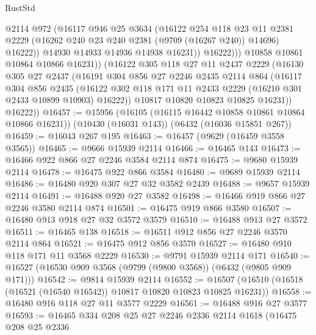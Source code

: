 \begin{lexlean}{RustStd}
\begin{coremodule}
                    @2114
                    @972
                    (@16117
                      @946
                      @25
                      @3634
                      (@16122
                        @254
                        @118
                        @23
                        @11
                        @2381
                        @2229
                        (@16262 @240 @23 @240 @2381 (@9709 (@16267 @240)) @14696)
                        @16222))
                    @14930
                    @14933
                    @14936
                    @14938
                    @16231))
                @16222)))
          @10858
          @10861
          @10864
          @10866
          @16231))
      (@16122
        @305
        @118
        @27
        @11
        @2437
        @2229
        (@16130
          @305
          @27
          @2437
          (@16191
            @304
            @856
            @27
            @2246
            @2435
            @2114
            @864
            (@16117
              @304
              @856
              @2435
              (@16122 @302 @118 @171 @11 @2433 @2229 (@16210 @301 @2433 @10899 @10903) @16222))
            @10817
            @10820
            @10823
            @10825
            @16231))
        @16222))
@16457 := @15956
    (@16105 (@16115 @16442 @10858 @10861 @10864 @10866 @16231))
    (@10430 (@16031 @143))
    (@6432 (@16036 @15851 @267))
@16459 := @16043 @267 @195
@16463 := @16457 (@9629 (@16459 @3558 @3565))
@16465 := @9666 @15939 @2114
@16466 := @16465 @143
@16473 := @16466 @922 @866 @27 @2246 @3584 @2114 @874
@16475 := @9680 @15939 @2114
@16478 := @16475 @922 @866 @3584
@16480 := @9689 @15939 @2114
@16486 := @16480 @920 @307 @27 @32 @3582 @2439
@16488 := @9657 @15939 @2114
@16491 := @16488 @920 @27 @3582
@16498 := @16466 @919 @866 @27 @2246 @3580 @2114 @874
@16501 := @16475 @919 @866 @3580
@16507 := @16480 @913 @918 @27 @32 @3572 @3579
@16510 := @16488 @913 @27 @3572
@16511 := @16465 @138
@16518 := @16511 @912 @856 @27 @2246 @3570 @2114 @864
@16521 := @16475 @912 @856 @3570
@16527 := @16480 @910 @118 @171 @11 @3568 @2229
@16530 := @9791 @15939 @2114 @171
@16540 := @16527 (@16530 @909 @3568 (@9799 (@9800 @3568)) (@6432 (@9805 @909 @171)))
@16542 := @9814 @15939 @2114
@16552 := @16507 (@16510 (@16518 (@16521 (@16540 @16542)) @10817 @10820 @10823 @10825 @16231))
@16558 := @16480 @916 @118 @27 @11 @3577 @2229
@16561 := @16488 @916 @27 @3577
@16593 := @16465
    @334
    @208
    @25
    @27
    @2246
    @2336
    @2114
    @1618
    (@16475
      @208
      @25
      @2336

\end{coremodule}
\end{lexlean}
